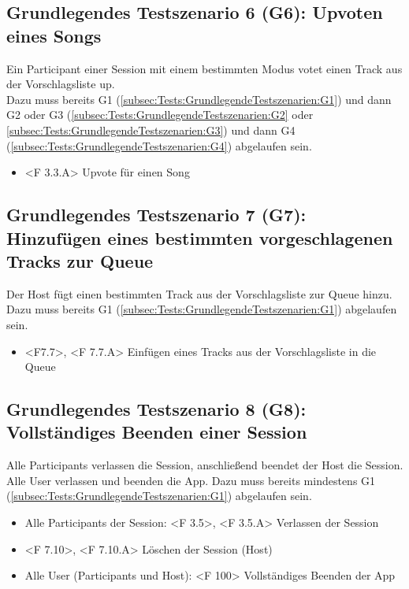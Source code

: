 \documentclass[oneside, ngerman]{sdqtechreport}
\begin{document}
\subsection{Grundlegendes Testszenario 6 (G6): Upvoten eines Songs}
\label{subsec:Tests:GrundlegendeTestszenarien:G6}
Ein Participant einer Session mit einem bestimmten Modus votet einen Track aus der Vorschlagsliste up. \\
Dazu muss bereits G1 (\ref{subsec:Tests:GrundlegendeTestszenarien:G1}) und dann G2 oder G3 (\ref{subsec:Tests:GrundlegendeTestszenarien:G2} oder \ref{subsec:Tests:GrundlegendeTestszenarien:G3}) und dann G4 (\ref{subsec:Tests:GrundlegendeTestszenarien:G4}) abgelaufen sein.
\begin{itemize}
    \item <F 3.3.A> Upvote für einen Song
\end{itemize}

\subsection{Grundlegendes Testszenario 7 (G7): Hinzufügen eines bestimmten vorgeschlagenen Tracks zur Queue}
\label{subsec:Tests:GrundlegendeTestszenarien:G7}
Der Host fügt einen bestimmten Track aus der Vorschlagsliste zur Queue hinzu.
Dazu muss bereits G1 (\ref{subsec:Tests:GrundlegendeTestszenarien:G1}) abgelaufen sein.
\begin{itemize}
    \item <F7.7>, <F 7.7.A> Einfügen eines Tracks aus der Vorschlagsliste in die Queue
\end{itemize}

\subsection{Grundlegendes Testszenario 8 (G8): Vollständiges Beenden einer Session}
\label{subsec:Tests:GrundlegendeTestszenarien:G8}
Alle Participants verlassen die Session, anschließend beendet der Host die Session. Alle User verlassen und beenden die App.
Dazu muss bereits mindestens G1 (\ref{subsec:Tests:GrundlegendeTestszenarien:G1}) abgelaufen sein.
\begin{itemize}
    \item Alle Participants der Session: <F 3.5>, <F 3.5.A> Verlassen der Session
    \item <F 7.10>, <F 7.10.A> Löschen der Session (Host)
    \item Alle User (Participants und Host): <F 100> Vollständiges Beenden der App
\end{itemize}
\end{document}
